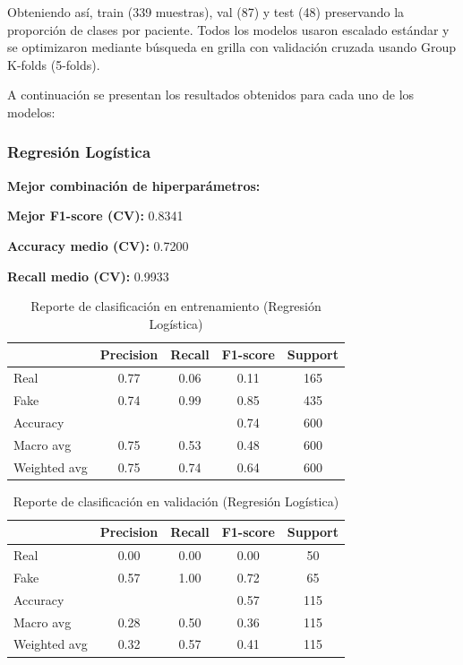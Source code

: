 \documentclass[conference]{IEEEtran}
\begin{document}
Obteniendo así, train (339 muestras), val (87) y test (48) preservando la proporción de clases por paciente. Todos los modelos usaron escalado estándar y se optimizaron mediante búsqueda en grilla con validación cruzada usando Group K-folds (5-folds).

A continuación se presentan los resultados obtenidos para cada uno de los modelos:
\newline
\newline

\subsubsection{Regresión Logística}

\textbf{Mejor combinación de hiperparámetros:} 


\textbf{Mejor F1-score (CV):} 0.8341 

\textbf{Accuracy medio (CV):} 0.7200 

\textbf{Recall medio (CV):} 0.9933

\begin{table}[htbp]
\centering
\caption{Reporte de clasificación en entrenamiento (Regresión Logística)}
\begin{tabular}{lcccc}
\toprule
 & Precision & Recall & F1-score & Support \\
\midrule
Real & 0.77 & 0.06 & 0.11 & 165 \\
Fake & 0.74 & 0.99 & 0.85 & 435 \\
\midrule
Accuracy & & & 0.74 & 600 \\
Macro avg & 0.75 & 0.53 & 0.48 & 600 \\
Weighted avg & 0.75 & 0.74 & 0.64 & 600 \\
\bottomrule
\end{tabular}
\label{tab:logistic_train}
\end{table}

\begin{table}[htbp]
\centering
\caption{Reporte de clasificación en validación (Regresión Logística)}
\begin{tabular}{lcccc}
\toprule
 & Precision & Recall & F1-score & Support \\
\midrule
Real & 0.00 & 0.00 & 0.00 & 50 \\
Fake & 0.57 & 1.00 & 0.72 & 65 \\
\midrule
Accuracy & & & 0.57 & 115 \\
Macro avg & 0.28 & 0.50 & 0.36 & 115 \\
Weighted avg & 0.32 & 0.57 & 0.41 & 115 \\
\bottomrule
\end{tabular}
\label{tab:logistic_val}
\end{table}
\end{document}
